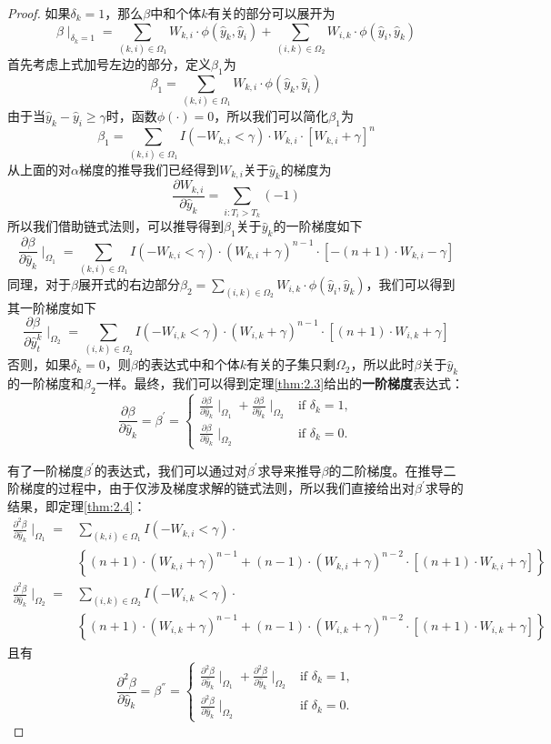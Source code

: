 \begin{proof}
如果$\delta_k = 1$，那么$\beta$中和个体$k$有关的部分可以展开为$$\beta \mid_{\delta_k=1}=\sum_{(k,i)\in \Omega_1} W_{k,i}\cdot \phi(\hat{y}_k, \hat{y}_i) + \sum_{(i,k)\in \Omega_2} W_{i,k}\cdot \phi(\hat{y}_i, \hat{y}_k) $$ 首先考虑上式加号左边的部分，定义$\beta_1$为$$\beta_1 = \sum_{(k,i)\in \Omega_1} W_{k,i}\cdot \phi(\hat{y}_k, \hat{y}_i)$$ 由于当$\hat{y}_k - \hat{y}_i \ge \gamma$时，函数$\phi(\cdot)=0$，所以我们可以简化$\beta_1$为$$\beta_1 = \sum_{(k,i)\in \Omega_1} I(-W_{k,i} < \gamma) \cdot W_{k,i}\cdot [W_{k,i} + \gamma]^n $$ 从上面的对$\alpha$梯度的推导我们已经得到$W_{k,i}$关于$\hat{y}_k$的梯度为$$\frac{\partial W_{k,i}}{\partial \hat{y}_k} = \sum\limits_{i: T_i>T_k}(-1)$$ 所以我们借助链式法则，可以推导得到$\beta_1$关于$\hat{y}_k$的一阶梯度如下$$
\frac{\partial \beta}{\partial \hat{y}_k} \mid_{\Omega_1} = \sum\limits_{(k,i)\in \Omega_1} {I(-W_{k,i}<\gamma)\cdot (W_{k,i}+\gamma)^{n-1}\cdot [-(n+1)\cdot W_{k,i}-\gamma]}
$$ 同理，对于$\beta$展开式的右边部分$\beta_2=\sum_{(i,k)\in \Omega_2} W_{i,k}\cdot \phi(\hat{y}_i, \hat{y}_k)$，我们可以得到其一阶梯度如下$$
\frac{\partial \beta}{\partial \hat{y}_t^k} \mid_{\Omega_2} = \sum\limits_{(i,k)\in \Omega_2} {I(-W_{i,k}<\gamma)\cdot (W_{i,k}+\gamma)^{n-1}\cdot [(n+1)\cdot W_{i,k}+\gamma]}
$$ 否则，如果$\delta_k = 0$，则$\beta$的表达式中和个体$k$有关的子集只剩$\Omega_2$，所以此时$\beta$关于$\hat{y}_k$的一阶梯度和$\beta_2$一样。最终，我们可以得到定理\ref{thm:2.3}给出的\textbf{一阶梯度}表达式：$$
\frac{\partial \beta}{\partial \hat{y}_k}=\beta^{'}=
\begin{cases}
\frac{\partial \beta}{\partial \hat{y}_k} \mid_{\Omega_1} + \frac{\partial \beta}{\partial \hat{y}_k} \mid_{\Omega_2} & \text{if } \delta_k = 1,\\
\frac{\partial \beta}{\partial \hat{y}_k} \mid_{\Omega_2} & \text{if } \delta_k = 0.
\end{cases}
$$

有了一阶梯度$\beta^{'}$的表达式，我们可以通过对$\beta^{'}$求导来推导$\beta$的二阶梯度。在推导二阶梯度的过程中，由于仅涉及梯度求解的链式法则，所以我们直接给出对$\beta^{'}$求导的结果，即定理\ref{thm:2.4}：\[
\begin{split}
\frac{\partial^2 \beta}{\partial \hat{y}_k} \mid_{\Omega_1} =& \sum\limits_{(k,i)\in \Omega_1} I(-W_{k,i}<\gamma)\cdot \\
  & \left\{(n+1)\cdot (W_{k,i}+\gamma)^{n-1} + (n-1)\cdot (W_{k,i}+\gamma)^{n-2}\cdot [(n+1)\cdot W_{k,i}+\gamma]\right\} \\
\frac{\partial^2 \beta}{\partial \hat{y}_k} \mid_{\Omega_2} =& \sum\limits_{(i,k)\in \Omega_2} I(-W_{i,k}<\gamma)\cdot \\
  & \left\{(n+1)\cdot (W_{i,k}+\gamma)^{n-1} + (n-1)\cdot (W_{i,k}+\gamma)^{n-2}\cdot [(n+1)\cdot W_{i,k}+\gamma]\right\}
\end{split}
\] 且有$$
\frac{\partial^2 \beta}{\partial \hat{y}_k}=\beta^{''}=
\begin{cases}
\frac{\partial^2 \beta}{\partial \hat{y}_k} \mid_{\Omega_1} + \frac{\partial^2 \beta}{\partial \hat{y}_k} \mid_{\Omega_2} & \text{if } \delta_k = 1,\\
\frac{\partial^2 \beta}{\partial \hat{y}_k} \mid_{\Omega_2} & \text{if } \delta_k = 0.
\end{cases}
$$
\end{proof}